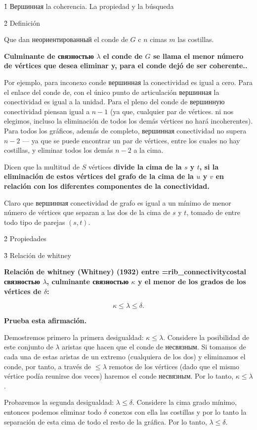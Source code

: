 \h1{ Вершинная la coherencia. La propiedad y la búsqueda }


\h2{ Definición }

Que dan неориентированный el conde de $G$ c $n$ cimas $m$ las costillas.

\bf{Culminante de связностью} $\lambda$ el conde de $G$ se llama el menor número de vértices que desea eliminar y, para el conde dejó de ser coherente..

Por ejemplo, para inconexo conde вершинная la conectividad es igual a cero. Para el enlace del conde de, con el único punto de articulación вершинная la conectividad es igual a la unidad. Para el pleno del conde de вершинную conectividad piensan igual a $n-1$ (ya que, cualquier par de vértices. ni nos elegimos, incluso la eliminación de todos los demás vértices no hará incoherentes). Para todos los gráficos, además de completo, вершинная conectividad no supera $n-2$ --- ya que se puede encontrar un par de vértices, entre los cuales no hay costillas, y eliminar todos los demás $n-2$ a la cima.

Dicen que la multitud de $S$ vértices \bf{divide} la cima de la $s$ y $t$, si la eliminación de estos vértices del grafo de la cima de la $u$ y $v$ en relación con los diferentes componentes de la conectividad.

Claro que вершинная conectividad de grafo es igual a un mínimo de menor número de vértices que separan a las dos de la cima de $s$ y $t$, tomado de entre todo tipo de parejas $(s,t)$.


\h2{ Propiedades }


\h3{ Relación de whitney }

\bf{Relación de whitney (Whitney)} (1932) entre \algohref=rib_connectivity{costal связностью} $\lambda$, culminante связностью $\kappa$ y el menor de los grados de los vértices de $\delta$:

$$ \kappa \le \lambda \le \delta. $$

\bf{Prueba} esta afirmación.

Demostremos primero la primera desigualdad: $\kappa \le \lambda$. Considere la posibilidad de este conjunto de $\lambda$ aristas que hacen que el conde de несвязным. Si tomamos de cada una de estas aristas de un extremo (cualquiera de los dos) y eliminamos el conde, por tanto, a través de $\le \lambda$ remotos de los vértices (dado que el mismo vértice podía reunirse dos veces) haremos el conde несвязным. Por lo tanto, $\kappa \le \lambda$.

Probaremos la segunda desigualdad: $\lambda \le \delta$. Considere la cima grado mínimo, entonces podemos eliminar todo $\delta$ conexos con ella las costillas y por lo tanto la separación de esta cima de todo el resto de la gráfica. Por lo tanto, $\lambda \le \delta$.

